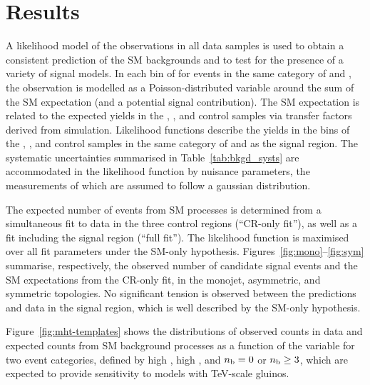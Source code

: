 \section{Results}
\label{sec:results}

A likelihood model of the observations in all data samples is used to
obtain a consistent prediction of the SM backgrounds and to test for
the presence of a variety of signal models.  In each bin of \scalht
for events in the same category of \njet and \nb, the observation is
modelled as a Poisson-distributed variable around the sum of the SM
expectation (and a potential signal contribution). The SM expectation
is related to the expected yields in the \mj, \mmj, and \gj control
samples via transfer factors derived from simulation. Likelihood
functions describe the yields in the \scalht bins of the \mj, \mmj,
and \gj control samples in the same category of \njet and \nb as the
signal region. The systematic uncertainties summarised in
Table~\ref{tab:bkgd_systs} are accommodated in the likelihood function
by nuisance parameters, the measurements of which are assumed to
follow a gaussian distribution. 

The expected number of events from SM processes is determined from a
simultaneous fit to data in the three control regions (``CR-only
fit''), as well as a fit including the signal region (``full
fit''). The likelihood function is maximised over all fit parameters
under the SM-only hypothesis.  Figures~\ref{fig:mono}--\ref{fig:sym}
summarise, respectively, the observed number of candidate signal
events and the SM expectations from the CR-only fit, in the monojet,
asymmetric, and symmetric topologies. No significant tension is
observed between the predictions and data in the signal region, which
is well described by the SM-only hypothesis.


Figure~\ref{fig:mht-templates} shows the distributions of observed
counts in data and expected counts from SM background processes as a
function of the \mht variable for two event categories, defined by
high \njet, high \scalht, and $n_{\text{b}} = 0$ or $n_{\text{b}} \geq 3$, which are
expected to provide sensitivity to models with TeV-scale gluinos.

